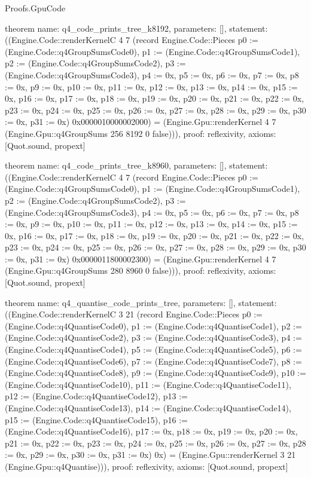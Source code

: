 \begin{lexlean}{Proofs.GpuCode}
\begin{semanticmodule}
theorem{
  name: q4_code_prints_tree_k8192,
  parameters: [],
  statement: ((Engine.Code::renderKernelC 4 7 (record Engine.Code::Pieces {p0 := (Engine.Code::q4GroupSumsCode0), p1 := (Engine.Code::q4GroupSumsCode1), p2 := (Engine.Code::q4GroupSumsCode2), p3 := (Engine.Code::q4GroupSumsCode3), p4 := 0x, p5 := 0x, p6 := 0x, p7 := 0x, p8 := 0x, p9 := 0x, p10 := 0x, p11 := 0x, p12 := 0x, p13 := 0x, p14 := 0x, p15 := 0x, p16 := 0x, p17 := 0x, p18 := 0x, p19 := 0x, p20 := 0x, p21 := 0x, p22 := 0x, p23 := 0x, p24 := 0x, p25 := 0x, p26 := 0x, p27 := 0x, p28 := 0x, p29 := 0x, p30 := 0x, p31 := 0x}) 0x0000010000002000) = (Engine.Gpu::renderKernel 4 7 (Engine.Gpu::q4GroupSums 256 8192 0 false))),
  proof: reflexivity{},
  axioms: [Quot.sound, propext]
}

theorem{
  name: q4_code_prints_tree_k8960,
  parameters: [],
  statement: ((Engine.Code::renderKernelC 4 7 (record Engine.Code::Pieces {p0 := (Engine.Code::q4GroupSumsCode0), p1 := (Engine.Code::q4GroupSumsCode1), p2 := (Engine.Code::q4GroupSumsCode2), p3 := (Engine.Code::q4GroupSumsCode3), p4 := 0x, p5 := 0x, p6 := 0x, p7 := 0x, p8 := 0x, p9 := 0x, p10 := 0x, p11 := 0x, p12 := 0x, p13 := 0x, p14 := 0x, p15 := 0x, p16 := 0x, p17 := 0x, p18 := 0x, p19 := 0x, p20 := 0x, p21 := 0x, p22 := 0x, p23 := 0x, p24 := 0x, p25 := 0x, p26 := 0x, p27 := 0x, p28 := 0x, p29 := 0x, p30 := 0x, p31 := 0x}) 0x0000011800002300) = (Engine.Gpu::renderKernel 4 7 (Engine.Gpu::q4GroupSums 280 8960 0 false))),
  proof: reflexivity{},
  axioms: [Quot.sound, propext]
}

theorem{
  name: q4_quantise_code_prints_tree,
  parameters: [],
  statement: ((Engine.Code::renderKernelC 3 21 (record Engine.Code::Pieces {p0 := (Engine.Code::q4QuantiseCode0), p1 := (Engine.Code::q4QuantiseCode1), p2 := (Engine.Code::q4QuantiseCode2), p3 := (Engine.Code::q4QuantiseCode3), p4 := (Engine.Code::q4QuantiseCode4), p5 := (Engine.Code::q4QuantiseCode5), p6 := (Engine.Code::q4QuantiseCode6), p7 := (Engine.Code::q4QuantiseCode7), p8 := (Engine.Code::q4QuantiseCode8), p9 := (Engine.Code::q4QuantiseCode9), p10 := (Engine.Code::q4QuantiseCode10), p11 := (Engine.Code::q4QuantiseCode11), p12 := (Engine.Code::q4QuantiseCode12), p13 := (Engine.Code::q4QuantiseCode13), p14 := (Engine.Code::q4QuantiseCode14), p15 := (Engine.Code::q4QuantiseCode15), p16 := (Engine.Code::q4QuantiseCode16), p17 := 0x, p18 := 0x, p19 := 0x, p20 := 0x, p21 := 0x, p22 := 0x, p23 := 0x, p24 := 0x, p25 := 0x, p26 := 0x, p27 := 0x, p28 := 0x, p29 := 0x, p30 := 0x, p31 := 0x}) 0x) = (Engine.Gpu::renderKernel 3 21 (Engine.Gpu::q4Quantise))),
  proof: reflexivity{},
  axioms: [Quot.sound, propext]
}


\end{semanticmodule}
\end{lexlean}
